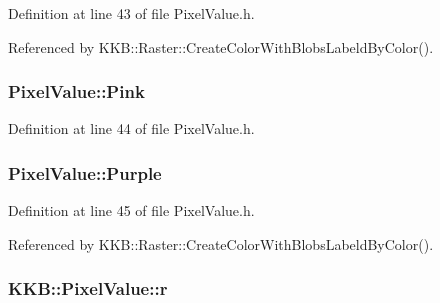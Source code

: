 Definition at line 43 of file Pixel\+Value.\+h.



Referenced by K\+K\+B\+::\+Raster\+::\+Create\+Color\+With\+Blobs\+Labeld\+By\+Color().

\subsubsection[{\texorpdfstring{Pink}{Pink}}]{ Pixel\+Value\+::\+Pink\hspace{0.3cm}{\ttfamily [static]}}\hypertarget{class_k_k_b_1_1_pixel_value_a1eff1072e211955fffb26b91bb7d80e4}{}\label{class_k_k_b_1_1_pixel_value_a1eff1072e211955fffb26b91bb7d80e4}


Definition at line 44 of file Pixel\+Value.\+h.

\subsubsection[{\texorpdfstring{Purple}{Purple}}]{ Pixel\+Value\+::\+Purple\hspace{0.3cm}{\ttfamily [static]}}\hypertarget{class_k_k_b_1_1_pixel_value_ad957c67e590c8abf653217642afebbac}{}\label{class_k_k_b_1_1_pixel_value_ad957c67e590c8abf653217642afebbac}


Definition at line 45 of file Pixel\+Value.\+h.



Referenced by K\+K\+B\+::\+Raster\+::\+Create\+Color\+With\+Blobs\+Labeld\+By\+Color().

\subsubsection[{\texorpdfstring{r}{r}}]{ K\+K\+B\+::\+Pixel\+Value\+::r}\hypertarget{class_k_k_b_1_1_pixel_value_a734e16b4afd9a270df67aa1ce726e2d0}{}\label{class_k_k_b_1_1_pixel_value_a734e16b4afd9a270df67aa1ce726e2d0}


